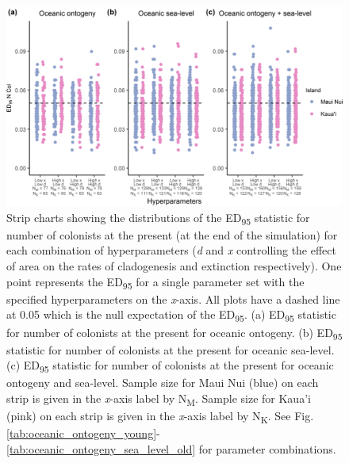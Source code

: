 \begin{figure}
    \centering
    \includegraphics{Hyperparameters_num_col.png}
    \caption{Strip charts showing the distributions of the ED\textsubscript{95} statistic for number of colonists at the present (at the end of the simulation) for each combination of hyperparameters (\textit{d} and \textit{x} controlling the effect of area on the rates of cladogenesis and extinction respectively). One point represents the ED\textsubscript{95} for a single parameter set with the specified hyperparameters on the \textit{x}-axis. All plots have a dashed line at 0.05 which is the null expectation of the ED\textsubscript{95}. (a) ED\textsubscript{95} statistic for number of colonists at the present for oceanic ontogeny. (b) ED\textsubscript{95} statistic for number of colonists at the present for oceanic sea-level. (c) ED\textsubscript{95} statistic for number of colonists at the present for oceanic ontogeny and sea-level. Sample size for Maui Nui (blue) on each strip is given in the \textit{x}-axis label by N\textsubscript{M}. Sample size for Kaua'i (pink) on each strip is given in the \textit{x}-axis label by N\textsubscript{K}. See Fig. \ref{tab:oceanic_ontogeny_young}-\ref{tab:oceanic_ontogeny_sea_level_old} for parameter combinations.}
    \label{fig:Hyperparameters_num_col}
\end{figure}

